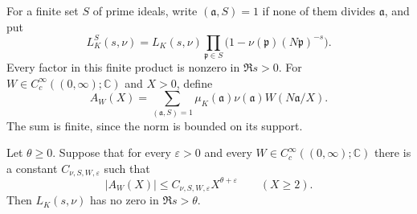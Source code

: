 For a finite set $S$ of prime ideals, write $(\mathfrak a,S)=1$ if none
of them divides $\mathfrak a$, and put
\begin{equation}\label{qr-eq-deleted-L}
 L_K^S(s,\nu)=L_K(s,\nu)
   \prod_{\mathfrak p\in S}
       \bigl(1-\nu(\mathfrak p)(N\mathfrak p)^{-s}\bigr).
\end{equation}
Every factor in this finite product is nonzero in $\Re s>0$.
For $W\in C_c^\infty((0,\infty);\mathbb C)$ and $X>0$, define
\begin{equation}\label{qr-eq-smooth-sum}
 A_W(X)=\sum_{(\mathfrak a,S)=1}
       \mu_K(\mathfrak a)\nu(\mathfrak a)
       W(N\mathfrak a/X).
\end{equation}
The sum is finite, since the norm is bounded on its support.

\begin{theorem}\label{qr-thm-mellin}
Let $\theta\geq0$. Suppose that for every $\varepsilon>0$ and every
$W\in C_c^\infty((0,\infty);\mathbb C)$ there is a constant
$C_{\nu,S,W,\varepsilon}$ such that
\begin{equation}\label{qr-eq-cancellation-input}
 |A_W(X)|\leq C_{\nu,S,W,\varepsilon}X^{\theta+\varepsilon}
 \qquad(X\geq2).
\end{equation}
Then $L_K(s,\nu)$ has no zero in $\Re s>\theta$.
\end{theorem}

